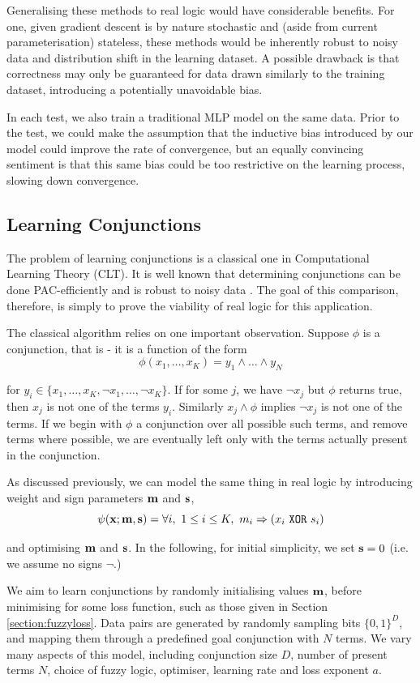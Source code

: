 Generalising these methods to real logic would have considerable benefits. For one, given gradient descent is by nature stochastic and (aside from current parameterisation) stateless, these methods would be inherently robust to noisy data and distribution shift in the learning dataset. A possible drawback is that correctness may only be guaranteed for data drawn similarly to the training dataset, introducing a potentially unavoidable bias.

In each test, we also train a traditional MLP model on the same data. Prior to the test, we could make the assumption that the inductive bias introduced by our model could improve the rate of convergence, but an equally convincing sentiment is that this same bias could be too restrictive on the learning process, slowing down convergence.

\subsection{Learning Conjunctions}

The problem of learning conjunctions is a classical one in Computational Learning Theory (CLT). It is well known that determining conjunctions can be done PAC-efficiently \cite{clt} and is robust to noisy data \cite{noisyclt}. The goal of this comparison, therefore, is simply to prove the viability of real logic for this application.

The classical algorithm relies on one important observation. Suppose $\phi$ is a conjunction, that is - it is a function of the form 
$$\phi(x_1, \dots, x_K) = y_1 \land \dots \land y_N$$

for $y_i \in \{x_1, \dots, x_K, \lnot x_1, \dots, \lnot x_K\}$. If for some $j$, we have $\lnot x_j$ but $\phi$ returns true, then $x_j$ is not one of the terms $y_i$. Similarly $x_j \land \phi$ implies $\lnot x_j$ is not one of the terms. If we begin with $\phi$ a conjunction over all possible such terms, and remove terms where possible, we are eventually left only with the terms actually present in the conjunction.

As discussed previously, we can model the same thing in real logic by introducing weight and sign parameters $\mathbf{m}$ and $\mathbf{s}$, 
$$\psi(\mathbf{x}; \mathbf{m}, \mathbf{s}) = \forall i,\ 1 \leq i \leq K,\ m_i \Rightarrow (x_i \ \texttt{XOR}\  s_i)$$

and optimising $\mathbf{m}$ and $\mathbf{s}$. In the following, for initial simplicity, we set $\mathbf{s} = 0$ (i.e. we assume no signs $\lnot$.) 

We aim to learn conjunctions by randomly initialising values $\mathbf{m}$, before minimising for some loss function, such as those given in Section \ref{section:fuzzyloss}. Data pairs are generated by randomly sampling bits $\{0,1\}^D$, and mapping them through a predefined goal conjunction with $N$ terms. We vary many aspects of this model, including conjunction size $D$, number of present terms $N$, choice of fuzzy logic, optimiser, learning rate and loss exponent $a$.

